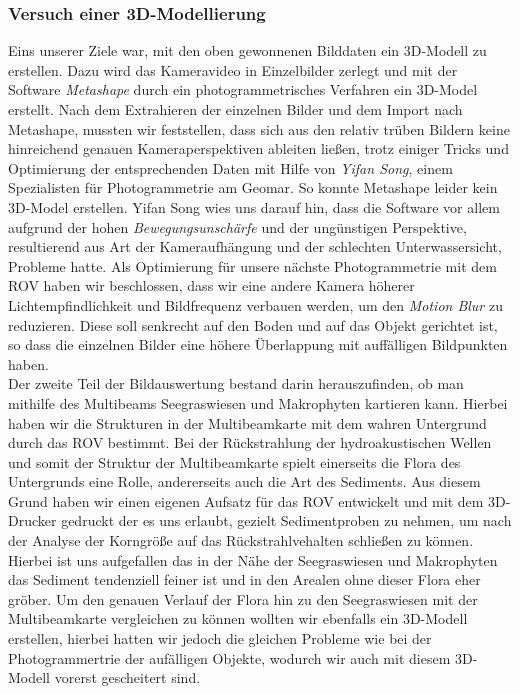 \subsubsection{Versuch einer 3D-Modellierung}
Eins unserer Ziele war, mit den oben gewonnenen Bilddaten ein 3D-Modell zu erstellen. Dazu wird das Kameravideo in Einzelbilder zerlegt und mit der Software \emph{Metashape} durch ein photogrammetrisches Verfahren ein 3D-Model erstellt. 
Nach dem Extrahieren der einzelnen Bilder und dem Import nach Metashape, mussten wir feststellen, dass sich aus den relativ trüben Bildern keine hinreichend genauen Kameraperspektiven ableiten ließen, trotz einiger Tricks und Optimierung der entsprechenden Daten mit Hilfe von \emph{Yifan Song}, einem Spezialisten für Photogrammetrie am Geomar. So konnte Metashape leider kein 3D-Model erstellen.
Yifan Song wies uns darauf hin, dass die Software vor allem aufgrund der hohen \emph{Bewegungsunschärfe} und der ungünstigen Perspektive, resultierend aus Art der Kameraufhängung und der schlechten Unterwassersicht, Probleme hatte. 
Als Optimierung für unsere nächste Photogrammetrie mit dem ROV haben wir beschlossen, dass wir eine andere Kamera höherer Lichtempfindlichkeit und Bildfrequenz verbauen werden, um den \emph{Motion Blur} zu reduzieren. Diese soll senkrecht auf den Boden und auf das Objekt gerichtet ist, so dass die einzelnen Bilder eine höhere Überlappung mit auffälligen Bildpunkten haben.
\\

Der zweite Teil der Bildauswertung bestand darin herauszufinden, ob man mithilfe des Multibeams Seegraswiesen und Makrophyten kartieren kann. Hierbei haben wir die Strukturen in der Multibeamkarte mit dem wahren Untergrund durch das ROV bestimmt.
Bei der Rückstrahlung der hydroakustischen Wellen und somit der Struktur der Multibeamkarte spielt einerseits die Flora des Untergrunds eine Rolle, andererseits auch die Art des Sediments.
Aus diesem Grund haben wir einen eigenen Aufsatz für das ROV entwickelt und mit dem 3D-Drucker gedruckt der es uns erlaubt, gezielt Sedimentproben zu nehmen, um nach der Analyse der Korngröße auf das Rückstrahlvehalten schließen zu können.
Hierbei ist uns aufgefallen das in der Nähe der Seegraswiesen und Makrophyten das Sediment tendenziell feiner ist und in den Arealen ohne dieser Flora eher gröber.
Um den genauen Verlauf der Flora hin zu den Seegraswiesen mit der Multibeamkarte vergleichen zu können wollten wir ebenfalls ein 3D-Modell erstellen, hierbei hatten wir jedoch die gleichen Probleme wie bei der Photogrammertrie der aufälligen Objekte, wodurch wir auch mit diesem 3D-Modell vorerst gescheitert sind.

